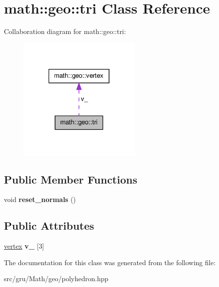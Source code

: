 \hypertarget{classmath_1_1geo_1_1tri}{\section{math\-:\-:geo\-:\-:tri \-Class \-Reference}
\label{classmath_1_1geo_1_1tri}
}


\-Collaboration diagram for math\-:\-:geo\-:\-:tri\-:\nopagebreak
\begin{figure}[H]
\begin{center}
\leavevmode
\includegraphics[width=172pt]{classmath_1_1geo_1_1tri__coll__graph}
\end{center}
\end{figure}
\subsection*{\-Public \-Member \-Functions}
\begin{DoxyCompactItemize}
\item 
\hypertarget{classmath_1_1geo_1_1tri_a9781ddeac1d6e0795ede6818f1ca52b8}{void {\bfseries reset\-\_\-normals} ()}\label{classmath_1_1geo_1_1tri_a9781ddeac1d6e0795ede6818f1ca52b8}

\end{DoxyCompactItemize}
\subsection*{\-Public \-Attributes}
\begin{DoxyCompactItemize}
\item 
\hypertarget{classmath_1_1geo_1_1tri_a1578bb4ca85d7adabc44b48e1fbbbe29}{\hyperlink{classmath_1_1geo_1_1vertex}{vertex} {\bfseries v\-\_\-} \mbox{[}3\mbox{]}}\label{classmath_1_1geo_1_1tri_a1578bb4ca85d7adabc44b48e1fbbbe29}

\end{DoxyCompactItemize}


\-The documentation for this class was generated from the following file\-:\begin{DoxyCompactItemize}
\item 
src/gru/\-Math/geo/polyhedron.\-hpp\end{DoxyCompactItemize}
